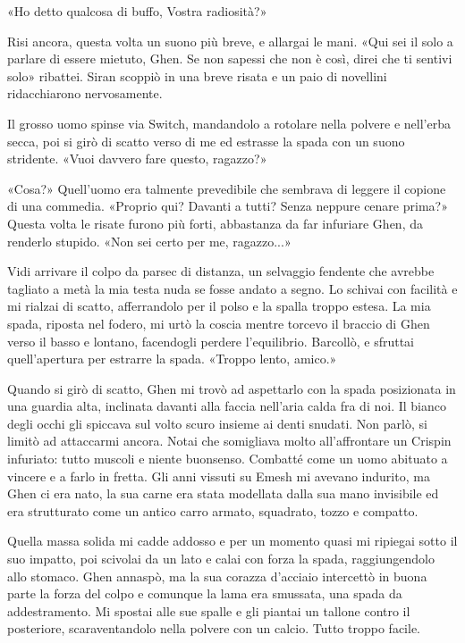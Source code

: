 «Ho detto qualcosa di buffo, Vostra radiosità?»

Risi ancora, questa volta un suono più breve, e allargai le mani. «Qui
sei il solo a parlare di essere mietuto, Ghen. Se non sapessi che non è
così, direi che ti sentivi solo» ribattei. Siran scoppiò in una breve
risata e un paio di novellini ridacchiarono nervosamente.

Il grosso uomo spinse via Switch, mandandolo a rotolare nella polvere e
nell'erba secca, poi si girò di scatto verso di me ed estrasse la spada
con un suono stridente. «Vuoi davvero fare questo, ragazzo?»

«Cosa?» Quell'uomo era talmente prevedibile che sembrava di leggere il
copione di una commedia. «Proprio qui? Davanti a tutti? Senza neppure
cenare prima?» Questa volta le risate furono più forti, abbastanza da
far infuriare Ghen, da renderlo stupido. «Non sei certo per me,
ragazzo...»

Vidi arrivare il colpo da parsec di distanza, un selvaggio fendente che
avrebbe tagliato a metà la mia testa nuda se fosse andato a segno. Lo
schivai con facilità e mi rialzai di scatto, afferrandolo per il polso e
la spalla troppo estesa. La mia spada, riposta nel fodero, mi urtò la
coscia mentre torcevo il braccio di Ghen verso il basso e lontano,
facendogli perdere l'equilibrio. Barcollò, e sfruttai quell'apertura per
estrarre la spada. «Troppo lento, amico.»

Quando si girò di scatto, Ghen mi trovò ad aspettarlo con la spada
posizionata in una guardia alta, inclinata davanti alla faccia nell'aria
calda fra di noi. Il bianco degli occhi gli spiccava sul volto scuro
insieme ai denti snudati. Non parlò, si limitò ad attaccarmi ancora.
Notai che somigliava molto all'affrontare un Crispin infuriato: tutto
muscoli e niente buonsenso. Combatté come un uomo abituato a vincere e a
farlo in fretta. Gli anni vissuti su Emesh mi avevano indurito, ma Ghen
ci era nato, la sua carne era stata modellata dalla sua mano invisibile
ed era strutturato come un antico carro armato, squadrato, tozzo e
compatto.

Quella massa solida mi cadde addosso e per un momento quasi mi ripiegai
sotto il suo impatto, poi scivolai da un lato e calai con forza la
spada, raggiungendolo allo stomaco. Ghen annaspò, ma la sua corazza
d'acciaio intercettò in buona parte la forza del colpo e comunque la
lama era smussata, una spada da addestramento. Mi spostai alle sue
spalle e gli piantai un tallone contro il posteriore, scaraventandolo
nella polvere con un calcio. Tutto troppo facile.

